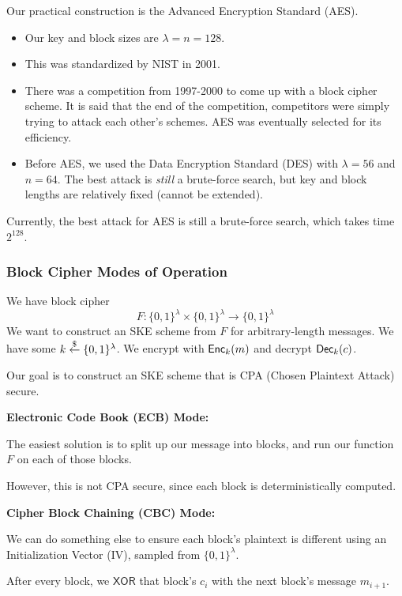 Our practical construction is the Advanced Encryption Standard (AES).
\begin{itemize}
    \item Our key and block sizes are $\lambda = n = 128$.
    \item This was standardized by NIST in 2001.
    \item There was a competition from 1997-2000 to come up with a block cipher scheme. It is said that the end of the competition, competitors were simply trying to attack each other's schemes. AES was eventually selected for its efficiency.
    \item Before AES, we used the Data Encryption Standard (DES) with $\lambda = 56$ and $n = 64$. The best attack is \emph{still} a brute-force search, but key and block lengths are relatively fixed (cannot be extended).
\end{itemize}

Currently, the best attack for AES is still a brute-force search, which takes time $2^{128}$.

\subsubsection{Block Cipher Modes of Operation}
\label{sec:feb9-block-cipher-moo}
We have block cipher
\[F : \{0, 1\}^\lambda\times \{0, 1\}^\lambda\to \{0, 1\}^\lambda\]
We want to construct an SKE scheme from $F$ for arbitrary-length messages. We have some $k\overset{\$}{\leftarrow}\{0, 1\}^\lambda$. We encrypt with $\operatorname{\mathsf{Enc}}_k(m)$ and decrypt $\operatorname{\mathsf{Dec}}_k(c)$.

Our goal is to construct an SKE scheme that is CPA (Chosen Plaintext Attack) secure.

\textbf{Electronic Code Book (ECB) Mode:}

The easiest solution is to split up our message into blocks, and run our function $F$ on each of those blocks.


However, this is not CPA secure, since each block is deterministically computed.

\textbf{Cipher Block Chaining (CBC) Mode:}

We can do something else to ensure each block's plaintext is different using an Initialization Vector (IV), sampled from $\{0, 1\}^\lambda$.

After every block, we $\mathsf{XOR}$ that block's $c_i$ with the next block's message $m_{i+1}$.

